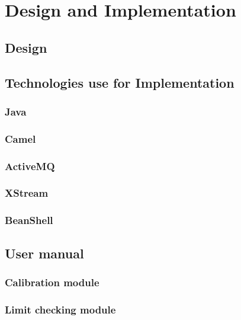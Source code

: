 \chapter{Design and Implementation}
\section{Design}
\section{Technologies use for Implementation}
\subsection{Java}
\subsection{Camel}
\subsection{ActiveMQ}
\subsection{XStream}
\subsection{BeanShell}
\section{User manual}
\subsection{Calibration module}
\subsection{Limit checking module}


\newpage

